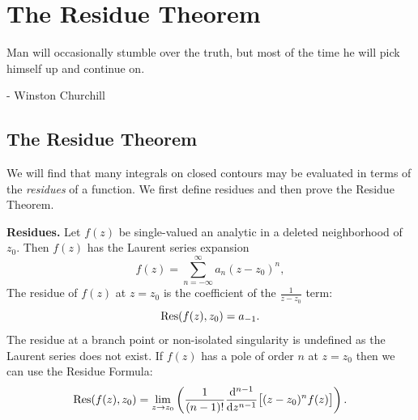 







\flushbottom
\chapter{The Residue Theorem}





Man will occasionally stumble over the truth, but most of the time 
he will pick himself up and continue on.

\begin{flushright}
  - Winston Churchill
\end{flushright}











\section{The Residue Theorem}




We will find that many integrals on closed contours may be evaluated
in terms of the \textit{residues} of a function.  We first define
residues and then prove the Residue Theorem.


\begin{Result}
  \textbf{Residues.}
  Let $f(z)$ be single-valued an analytic in a deleted neighborhood of $z_0$.
  Then $f(z)$ has the Laurent series expansion
  \[ 
  f(z) = \sum_{n=-\infty}^{\infty} a_n (z-z_0)^n, 
  \]
  The residue of $f(z)$ at $z = z_0$ is the coefficient of the $\frac{1}{z-z_0}$
  term:
  \[ 
  \mathop{\mathrm{Res}}\nolimits(f(z),z_0) = a_{-1}.
  \]
  The residue at a branch point or non-isolated singularity is undefined as 
  the Laurent series does not exist.
  If $f(z)$ has a pole of order $n$ at $z=z_0$ then we can use the 
  Residue Formula:
  \[
  \mathop{\mathrm{Res}}\nolimits(f(z),z_0) = \lim_{z \to z_0} \left( \frac{1}{(n-1)!}
    \frac{\mathrm{d}^{n-1}}{\mathrm{d} z^{n-1}}\big[(z-z_0)^n f(z)\big] \right). 
  \]
\end{Result}

